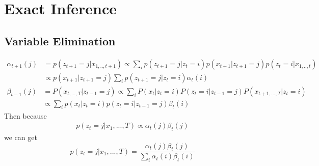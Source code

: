 \documentclass[twoside]{article}
\begin{document}
\newpage
\section{Exact Inference}
\subsection{Variable Elimination}
\begin{align*}
\alpha_{t+1}(j) &= p(z_{t+1}=j|x_{1,..,t+1}) \propto \sum_{i}p(z_{t+1}=j|z_{t}=i)p(x_{t+1}|z_{t+1}=j)p(z_{t}=i|x_{1,..,t})\\
&\propto p(x_{t+1}|z_{t+1}=j)\sum_{i}p(z_{t+1}=j|z_{t}=i)\alpha_{t}(i)
\end{align*}
\begin{align*}
\beta_{t-1}(j)&=P(x_{t,...,T}|z_{t-1}=j)\propto \sum_i P(x_t|z_t=i)P(z_t=i|z_{t-1}=j)P(x_{t+1,...,T}|z_t=i)\\
&\propto \sum_i p(x_t|z_t=i)p(z_t=i|z_{t-1}=j)\beta_t(i)
\end{align*}
Then because
\begin{align*}
p(z_t=j|x_1,...,T)\propto \alpha_t(j)\beta_t(j)
\end{align*}
we can get
$$p(z_t=j|x_1,...,T) =\frac{\alpha_t(j)\beta_t(j)}{\sum_i \alpha_t(i)\beta_t(i)}$$
\end{document}
